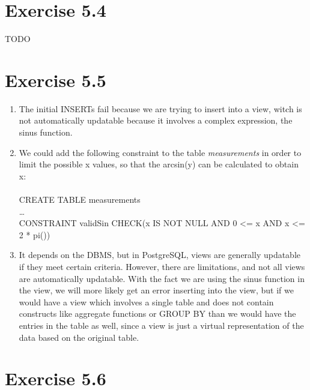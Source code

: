 \documentclass{article} %
\newcommand{\homeworkNumber}{5}
\begin{document}
\section*{Exercise \homeworkNumber.4}

TODO

\section*{Exercise \homeworkNumber.5}

\begin{enumerate}[(1)]
\item The initial INSERTs fail because we are trying to insert into a view, witch is not automatically updatable because it involves a complex expression, the sinus function.

\item We could add the following constraint to the table \textit{measurements} in order to limit the possible x values, so that the arcsin(y) can be calculated to obtain x:\\\\
CREATE TABLE measurements\\
\dots\\
CONSTRAINT validSin CHECK(x IS NOT NULL AND 0 <= x AND x <= 2 * pi())

\item It depends on the DBMS, but in PostgreSQL, views are generally updatable if they meet certain criteria. However, there are limitations, and not all views are automatically updatable. With the fact we are using the sinus function in the view, we will more likely get an error inserting into the view, but if we would have a view which involves a single table and does not contain constructs like aggregate functions or GROUP BY than we would have the entries in the table as well, since a view is just a virtual representation of the data based on the original table.
\end{enumerate}

\section*{Exercise \homeworkNumber.6}
\end{document}
